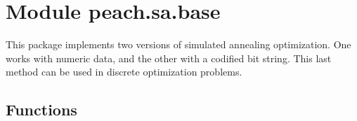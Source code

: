 %
%
%


\section{Module peach.sa.base}

    \label{peach:sa:base}

This package implements two versions of simulated annealing optimization. One
works with numeric data, and the other with a codified bit string. This last
method can be used in discrete optimization problems.


  \subsection{Functions}

    \label{peach:sa:base:standard_normal}

    \vspace{0.5ex}

